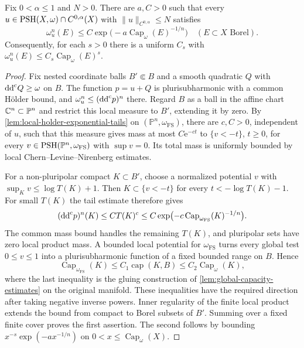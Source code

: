 \begin{proposition}\label{prop:holder-reference-capacity}
Fix $0<\alpha\leq1$ and $N>0$. There are $a,C>0$ such that every $u\in\mathrm{PSH}(X,\omega)\cap C^{0,\alpha}(X)$ with $\|u\|_{C^{0,\alpha}}\leq N$ satisfies
\[
 \omega_u^n(E)\leq C\exp\bigl(-a\operatorname{Cap}_\omega(E)^{-1/n}\bigr)
 \quad(E\subset X\text{ Borel}).
\]
Consequently, for each $s>0$ there is a uniform $C_s$ with $\omega_u^n(E)\leq C_s\operatorname{Cap}_\omega(E)^s$.
\end{proposition}
\begin{proof}
Fix nested coordinate balls $B'\Subset B$ and a smooth quadratic $Q$ with $\mathrm{dd}^{\mathrm{c}} Q\geq\omega$ on $B$. The function $p=u+Q$ is plurisubharmonic with a common H\"older bound, and $\omega_u^n\leq(\mathrm{dd}^{\mathrm{c}} p)^n$ there. Regard $B$ as a ball in the affine chart $\mathbb C^n\subset\mathbb P^n$ and restrict this local measure to $B'$, extending it by zero. By \cref{lem:local-holder-exponential-tails} on $(\mathbb P^n,\omega_{\mathrm{FS}})$, there are $c,C>0$, independent of $u$, such that this measure gives mass at most $C\mathrm e^{-ct}$ to $\{v<-t\}$, $t\geq0$, for every $v\in\mathrm{PSH}(\mathbb P^n,\omega_{\mathrm{FS}})$ with $\sup v=0$. Its total mass is uniformly bounded by local Chern--Levine--Nirenberg estimates.

For a non-pluripolar compact $K\subset B'$, choose a normalized potential $v$ with $\sup_Kv\leq\log T(K)+1$. Then $K\subset\{v<-t\}$ for every $t<-\log T(K)-1$. For small $T(K)$ the tail estimate therefore gives
\[
 (\mathrm{dd}^{\mathrm{c}} p)^n(K)\leq C T(K)^c
 \leq C\exp\bigl(-c\operatorname{Cap}_{\omega_{\mathrm{FS}}}(K)^{-1/n}\bigr).
\]
The common mass bound handles the remaining $T(K)$, and pluripolar sets have zero local product mass. A bounded local potential for $\omega_{\mathrm{FS}}$ turns every global test $0\leq v\leq1$ into a plurisubharmonic function of a fixed bounded range on $B$. Hence
\[
 \operatorname{Cap}_{\omega_{\mathrm{FS}}}(K)
 \leq C_1\operatorname{cap}(K,B)
 \leq C_2\operatorname{Cap}_\omega(K),
\]
where the last inequality is the gluing construction of \cref{lem:global-capacity-estimates} on the original manifold. These inequalities have the required direction after taking negative inverse powers. Inner regularity of the finite local product extends the bound from compact to Borel subsets of $B'$. Summing over a fixed finite cover proves the first assertion. The second follows by bounding $x^{-s}\exp(-ax^{-1/n})$ on $0<x\leq\operatorname{Cap}_\omega(X)$.
\end{proof}
